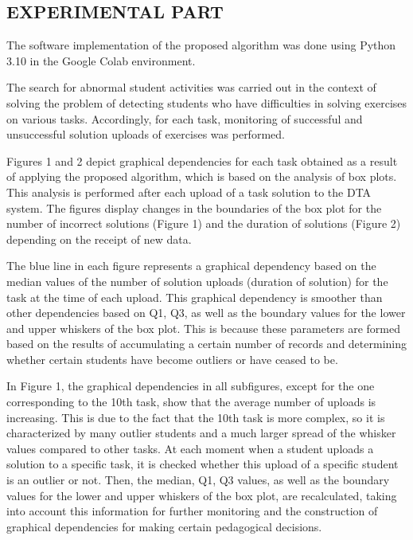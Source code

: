 \documentclass[letterpaper]{article}
\begin{document}
  \begin{multicols}{2}
    \begin{justify}
      \section{EXPERIMENTAL PART}
      The software implementation of the proposed algorithm was done using Python 3.10 in the Google Colab environment.

      The search for abnormal student activities was carried out in the context of solving the problem of detecting students who have difficulties in solving exercises on various tasks. Accordingly, for each task, monitoring of successful and unsuccessful solution uploads of exercises was performed.

      Figures 1 and 2 depict graphical dependencies for each task obtained as a result of applying the proposed algorithm, which is based on the analysis of box plots. This analysis is performed after each upload of a task solution to the DTA system. The figures display changes in the boundaries of the box plot for the number of incorrect solutions (Figure 1) and the duration of solutions (Figure 2) depending on the receipt of new data.

      The blue line in each figure represents a graphical dependency based on the median values of the number of solution uploads (duration of solution) for the task at the time of each upload. This graphical dependency is smoother than other dependencies based on Q1, Q3, as well as the boundary values for the lower and upper whiskers of the box plot. This is because these parameters are formed based on the results of accumulating a certain number of records and determining whether certain students have become outliers or have ceased to be.

      In Figure 1, the graphical dependencies in all subfigures, except for the one corresponding to the 10th task, show that the average number of uploads is increasing. This is due to the fact that the 10th task is more complex, so it is characterized by many outlier students and a much larger spread of the whisker values compared to other tasks. At each moment when a student uploads a solution to a specific task, it is checked whether this upload of a specific student is an outlier or not. Then, the median, Q1, Q3 values, as well as the boundary values for the lower and upper whiskers of the box plot, are recalculated, taking into account this information for further monitoring and the construction of graphical dependencies for making certain pedagogical decisions.


\end{justify}
\end{multicols}
\end{document}
